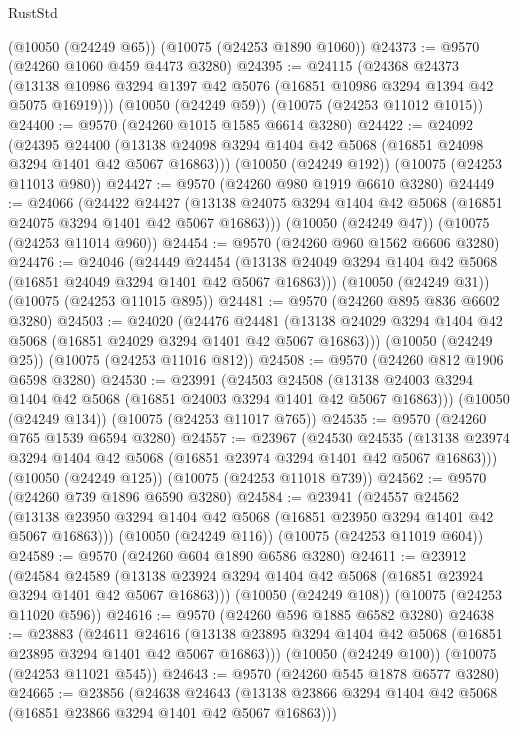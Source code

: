 \begin{lexlean}{RustStd}
\begin{coremodule}
    (@10050 (@24249 @65))
    (@10075 (@24253 @1890 @1060))
@24373 := @9570 (@24260 @1060 @459 @4473 @3280)
@24395 := @24115
    (@24368
      @24373
      (@13138 @10986 @3294 @1397 @42 @5076 (@16851 @10986 @3294 @1394 @42 @5075 @16919)))
    (@10050 (@24249 @59))
    (@10075 (@24253 @11012 @1015))
@24400 := @9570 (@24260 @1015 @1585 @6614 @3280)
@24422 := @24092
    (@24395
      @24400
      (@13138 @24098 @3294 @1404 @42 @5068 (@16851 @24098 @3294 @1401 @42 @5067 @16863)))
    (@10050 (@24249 @192))
    (@10075 (@24253 @11013 @980))
@24427 := @9570 (@24260 @980 @1919 @6610 @3280)
@24449 := @24066
    (@24422
      @24427
      (@13138 @24075 @3294 @1404 @42 @5068 (@16851 @24075 @3294 @1401 @42 @5067 @16863)))
    (@10050 (@24249 @47))
    (@10075 (@24253 @11014 @960))
@24454 := @9570 (@24260 @960 @1562 @6606 @3280)
@24476 := @24046
    (@24449
      @24454
      (@13138 @24049 @3294 @1404 @42 @5068 (@16851 @24049 @3294 @1401 @42 @5067 @16863)))
    (@10050 (@24249 @31))
    (@10075 (@24253 @11015 @895))
@24481 := @9570 (@24260 @895 @836 @6602 @3280)
@24503 := @24020
    (@24476
      @24481
      (@13138 @24029 @3294 @1404 @42 @5068 (@16851 @24029 @3294 @1401 @42 @5067 @16863)))
    (@10050 (@24249 @25))
    (@10075 (@24253 @11016 @812))
@24508 := @9570 (@24260 @812 @1906 @6598 @3280)
@24530 := @23991
    (@24503
      @24508
      (@13138 @24003 @3294 @1404 @42 @5068 (@16851 @24003 @3294 @1401 @42 @5067 @16863)))
    (@10050 (@24249 @134))
    (@10075 (@24253 @11017 @765))
@24535 := @9570 (@24260 @765 @1539 @6594 @3280)
@24557 := @23967
    (@24530
      @24535
      (@13138 @23974 @3294 @1404 @42 @5068 (@16851 @23974 @3294 @1401 @42 @5067 @16863)))
    (@10050 (@24249 @125))
    (@10075 (@24253 @11018 @739))
@24562 := @9570 (@24260 @739 @1896 @6590 @3280)
@24584 := @23941
    (@24557
      @24562
      (@13138 @23950 @3294 @1404 @42 @5068 (@16851 @23950 @3294 @1401 @42 @5067 @16863)))
    (@10050 (@24249 @116))
    (@10075 (@24253 @11019 @604))
@24589 := @9570 (@24260 @604 @1890 @6586 @3280)
@24611 := @23912
    (@24584
      @24589
      (@13138 @23924 @3294 @1404 @42 @5068 (@16851 @23924 @3294 @1401 @42 @5067 @16863)))
    (@10050 (@24249 @108))
    (@10075 (@24253 @11020 @596))
@24616 := @9570 (@24260 @596 @1885 @6582 @3280)
@24638 := @23883
    (@24611
      @24616
      (@13138 @23895 @3294 @1404 @42 @5068 (@16851 @23895 @3294 @1401 @42 @5067 @16863)))
    (@10050 (@24249 @100))
    (@10075 (@24253 @11021 @545))
@24643 := @9570 (@24260 @545 @1878 @6577 @3280)
@24665 := @23856
    (@24638
      @24643
      (@13138 @23866 @3294 @1404 @42 @5068 (@16851 @23866 @3294 @1401 @42 @5067 @16863)))

\end{coremodule}
\end{lexlean}
